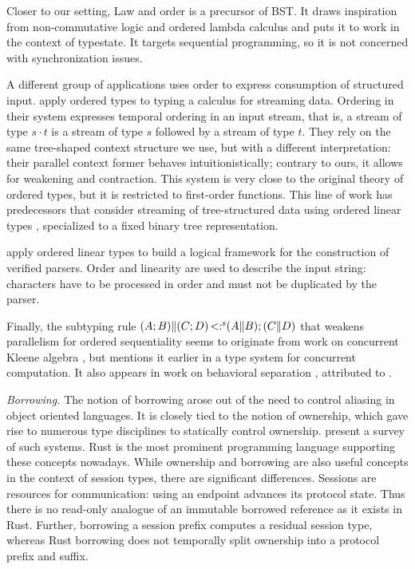Closer to our setting, Law and order
\cite{DBLP:journals/pacmpl/Saffrich0024} is a precursor of BST. It
draws inspiration from non-commutative logic and ordered lambda
calculus and puts it to work in the context of typestate. It targets
sequential programming, so it is not concerned with synchronization
issues.

A different group of applications uses order to express consumption of
structured input. \citet{DBLP:journals/pacmpl/CutlerWNHGSP24} apply
ordered types to typing a calculus for streaming data. Ordering in
their system expresses temporal ordering in an input stream, that is, a
stream of type $s\cdot t$ is a stream of type $s$ followed by a stream
of type $t$. They rely on the same tree-shaped context structure we use, but with a
different interpretation: their parallel context former behaves
intuitionistically; contrary to ours, it allows for weakening and
contraction. This system is very close to the original theory of
ordered types, but it is restricted to first-order functions. This
line of work has predecessors that consider streaming of
tree-structured data using ordered linear types
\cite{DBLP:journals/jfp/KodamaSK08,DBLP:journals/jip/SatoSK11},
specialized to a fixed binary tree representation.

\citet{DBLP:journals/pacmpl/SchaeferVAN25} apply ordered linear
types to build a logical framework for the construction of verified
parsers. Order and linearity are used to describe the input string:
characters have to be processed in order and must not be duplicated by
the parser.

Finally, the subtyping rule
$(A;B) \| (C;D) \operatorname{<:^s} (A \| B) ; (C \| D)$ that weakens
parallelism for ordered sequentiality seems to
originate from work on concurrent Kleene algebra
\cite{DBLP:conf/concur/HoareMSW09}, but \citet{CAIRES2008120} mentions it
earlier in a type system for concurrent computation. It also appears
in work on behavioral separation \cite{DBLP:conf/popl/CairesS13}, attributed to
\citet{DBLP:journals/tcs/BloomE96a}.

\emph{Borrowing.}
%
The notion of borrowing arose out of the need to control
aliasing in object oriented languages. It is closely tied to the notion of
ownership, which gave rise to numerous type disciplines to statically control
ownership. \citet{DBLP:series/lncs/ClarkeOSW13} present a survey of such
systems. Rust \cite{team24:_rust_progr_languag} is the most prominent
programming language supporting these concepts nowadays.
%
While ownership and borrowing are also useful concepts in the context
of session types, there are significant differences. Sessions are
resources for communication: using an endpoint advances its protocol
state. Thus there is no read-only analogue of an immutable borrowed
reference as it exists in Rust. Further, borrowing a session prefix
computes a residual session type, whereas Rust borrowing does not
temporally split ownership into a protocol prefix and suffix.

